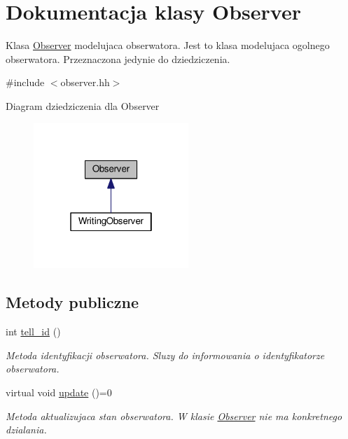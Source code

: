 \hypertarget{class_observer}{\section{Dokumentacja klasy Observer}
\label{class_observer}
}


Klasa \hyperlink{class_observer}{Observer} modelujaca obserwatora. Jest to klasa modelujaca ogolnego obserwatora. Przeznaczona jedynie do dziedziczenia.  




{\ttfamily \#include $<$observer.\-hh$>$}



Diagram dziedziczenia dla Observer
\nopagebreak
\begin{figure}[H]
\begin{center}
\leavevmode
\includegraphics[width=166pt]{class_observer__inherit__graph}
\end{center}
\end{figure}
\subsection*{Metody publiczne}
\begin{DoxyCompactItemize}
\item 
int \hyperlink{class_observer_a46f35957f410c0390ccfd03440b5b558}{tell\-\_\-id} ()
\begin{DoxyCompactList}\small\item\em Metoda identyfikacji obserwatora. Sluzy do informowania o identyfikatorze obserwatora. \end{DoxyCompactList}\item 
virtual void \hyperlink{class_observer_ac75e4b339faeb3ea6fe0a01bf0b4a215}{update} ()=0
\begin{DoxyCompactList}\small\item\em Metoda aktualizujaca stan obserwatora. W klasie \hyperlink{class_observer}{Observer} nie ma konkretnego dzialania. \end{DoxyCompactList}\end{DoxyCompactItemize}

